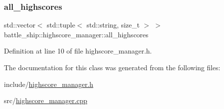 \subsubsection{\texorpdfstring{all\+\_\+highscores}{all\_highscores}}
{\footnotesize\ttfamily std\+::vector$<$ std\+::tuple$<$ std\+::string, size\+\_\+t $>$ $>$ battle\+\_\+ship\+::highscore\+\_\+manager\+::all\+\_\+highscores\hspace{0.3cm}{\ttfamily [static]}}



Definition at line 10 of file highscore\+\_\+manager.\+h.



The documentation for this class was generated from the following files\+:\begin{DoxyCompactItemize}
\item 
include/\hyperlink{highscore__manager_8h}{highscore\+\_\+manager.\+h}\item 
src/\hyperlink{highscore__manager_8cpp}{highscore\+\_\+manager.\+cpp}\end{DoxyCompactItemize}
